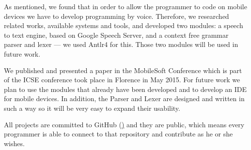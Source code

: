As mentioned, we found that in order to allow the programmer to code on mobile devices we have to develop programming by voice. Therefore, we researched related works, available systems and tools, and developed two modules: a speech to text engine, based on Google Speech Server, and a context free grammar parser and lexer --- we used Antlr4 for this. Those two modules will be used in future work.

We published and presented a paper in the MobileSoft Conference which is part of the ICSE conference took place in Florence in May 2015.
For future work we plan to use the modules that already have been developed and to develop an IDE for mobile devices. In addition, the Parser and Lexer are designed and written in such a way so it will be very easy to expand their usability.

All projects are committed to GitHub (\href{https://github.com/shaolinrabbi/DeveryWhere.git}) and they are public, which means every programmer is able to connect to that repository and contribute as he or she wishes.